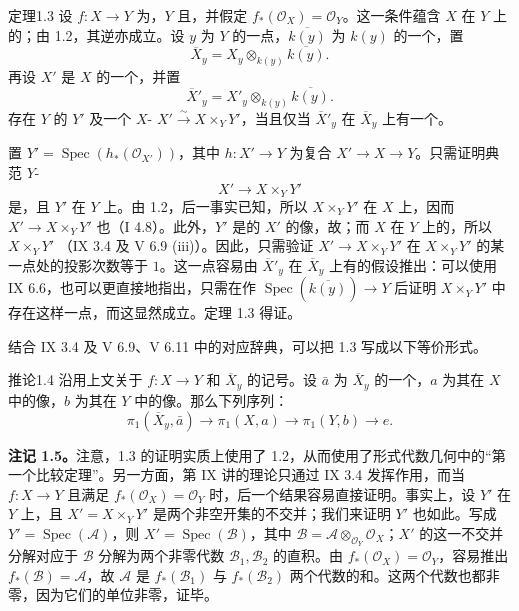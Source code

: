 \begin{SGAresult}{定理}{1.3}
设 $f:X\to Y$ 为，$Y$  且，并假定 $f_*(\mathcal O_X)=\mathcal O_Y$。这一条件蕴含 $X$ 在 $Y$ 上的；由 1.2，其逆亦成立。设 $y$ 为 $Y$ 的一点，$\overline{k(y)}$ 为 $k(y)$ 的一个，置
\[
\overline X_y=X_y\otimes_{k(y)}\overline{k(y)}.
\]
再设 $X'$ 是 $X$ 的一个，并置
\[
\overline X'_y=X'_y\otimes_{k(y)}\overline{k(y)}.
\]
存在 $Y$ 的 $Y'$ 及一个 $X$- $X'\xrightarrow{\sim}X\times_Y Y'$，当且仅当 $\overline X'_y$ 在 $\overline X_y$ 上有一个。
\end{SGAresult}
置 $Y'=\operatorname{Spec}(h_*(\mathcal O_{X'}))$，其中 $h:X'\to Y$ 为复合 $X'\to X\to Y$。只需证明典范 $Y$-
\[
X'\longrightarrow X\times_Y Y'
\]
是，且 $Y'$ 在 $Y$ 上。由 1.2，后一事实已知，所以 $X\times_Y Y'$ 在 $X$ 上，因而 $X'\to X\times_Y Y'$ 也（I 4.8）。此外，$Y'$ 是的 $X'$ 的像，故；而 $X$ 在 $Y$ 上的，所以 $X\times_Y Y'$ （IX 3.4 及 V 6.9 (iii)）。因此，只需验证 $X'\to X\times_Y Y'$ 在 $X\times_Y Y'$ 的某一点处的投影次数等于 $1$。这一点容易由 $\overline X'_y$ 在 $\overline X_y$ 上有的假设推出：可以使用 IX 6.6，也可以更直接地指出，只需在作 $\operatorname{Spec}(\overline{k(y)})\to Y$ 后证明 $X\times_Y Y'$ 中存在这样一点，而这显然成立。定理 1.3 得证。

结合 IX 3.4 及 V 6.9、V 6.11 中的对应辞典，可以把 1.3 写成以下等价形式。
\begin{SGAresult}{推论}{1.4}
沿用上文关于 $f:X\to Y$ 和 $\overline X_y$ 的记号。设 $\bar a$ 为 $\overline X_y$ 的一个，$a$ 为其在 $X$ 中的像，$b$ 为其在 $Y$ 中的像。那么下列序列：
\[
\pi_1(\overline X_y,\bar a)\longrightarrow\pi_1(X,a)
\longrightarrow\pi_1(Y,b)\longrightarrow e.
\]
\end{SGAresult}
\textbf{注记 1.5。}注意，1.3 的证明实质上使用了 1.2，从而使用了形式代数几何中的“第一个比较定理”。另一方面，第 IX 讲的理论只通过 IX 3.4 发挥作用，而当 $f:X\to Y$ 且满足 $f_*(\mathcal O_X)=\mathcal O_Y$ 时，后一个结果容易直接证明。事实上，设 $Y'$ 在 $Y$ 上，且 $X'=X\times_Y Y'$ 是两个非空开集的不交并；我们来证明 $Y'$ 也如此。写成 $Y'=\operatorname{Spec}(\mathcal A)$，则 $X'=\operatorname{Spec}(\mathcal B)$，其中 $\mathcal B=\mathcal A\otimes_{\mathcal O_Y}\mathcal O_X$；$X'$ 的这一不交并分解对应于 $\mathcal B$ 分解为两个非零代数 $\mathcal B_1,\mathcal B_2$ 的直积。由 $f_*(\mathcal O_X)=\mathcal O_Y$，容易推出 $f_*(\mathcal B)=\mathcal A$，故 $\mathcal A$ 是 $f_*(\mathcal B_1)$ 与 $f_*(\mathcal B_2)$ 两个代数的和。这两个代数也都非零，因为它们的单位非零，证毕。

